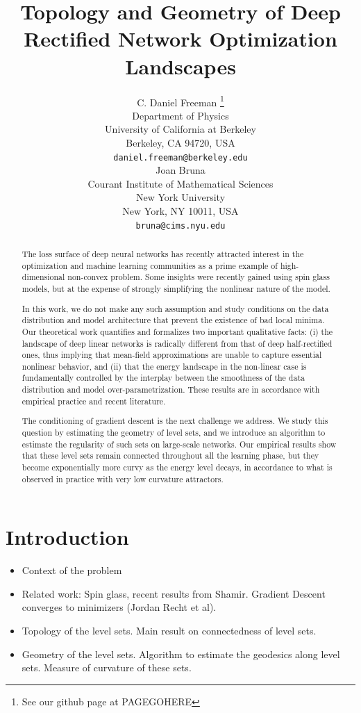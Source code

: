 \documentclass{article} %
\title{Topology and Geometry of Deep Rectified Network Optimization Landscapes }
\author{C. Daniel Freeman \thanks{ See our github page at PAGEGOHERE} \\
Department of Physics\\
University of California at Berkeley\\
Berkeley, CA 94720, USA \\
\texttt{daniel.freeman@berkeley.edu} \\
\And
Joan Bruna \\
Courant Institute of Mathematical Sciences \\
New York University \\
New York, NY 10011, USA \\
\texttt{bruna@cims.nyu.edu} \\
}
\begin{document}
\maketitle

\begin{abstract}
The loss surface of deep neural networks has recently attracted interest 
in the optimization and machine learning communities as a prime example of 
high-dimensional non-convex problem. Some insights were recently gained using spin glass 
models, but at the expense of strongly simplifying the nonlinear nature of the model.

In this work, we do not make any such assumption and study conditions 
on the data distribution and model architecture that prevent the existence 
of bad local minima. Our theoretical work quantifies and formalizes two 
important qualitative facts: (i) the landscape of deep linear networks is radically different 
from that of deep half-rectified ones, thus implying that mean-field approximations
are unable to capture essential nonlinear behavior, and (ii) that the energy landscape 
in the non-linear case is fundamentally controlled by the interplay between the smoothness of the data distribution and model over-parametrization. 
These results are in accordance with empirical practice and recent literature. 

The conditioning of gradient descent is the next challenge we address. 
We study this question by estimating the geometry of level sets, and we introduce
an algorithm to estimate the regularity of such sets on large-scale networks. 
Our empirical results show that these level sets remain connected throughout 
all the learning phase, but they become exponentially more curvy 
as the energy level decays, in accordance to what is observed in practice with 
very low curvature attractors.
\end{abstract}


\section{Introduction}
\label{sec:Intro}

\begin{itemize}
\item Context of the problem
\item Related work: Spin glass, recent results from Shamir. Gradient Descent converges to minimizers (Jordan Recht et al). 
\item Topology of the level sets. Main result on connectedness of level sets.
\item Geometry of the level sets. Algorithm to estimate the geodesics along level sets. Measure of curvature of these sets. 
\end{itemize}
  
\end{document}
